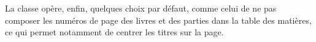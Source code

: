 \begin{noprint}

\if@draft{}\fi
\end{noprint}

La classe opère, enfin, quelques choix par défaut, comme celui de ne pas composer les numéros de page des livres et des parties dans la table des matières, ce qui permet notamment de centrer les titres sur la page.

\begin{noprint}
\renewcommand*{\cftdotsep}{2}
\end{noprint}

\begin{noprint}
\if@article\else
	\pretocmd{\tableofcontents}{\clearforchapter}{}{}
\fi
\end{noprint}



